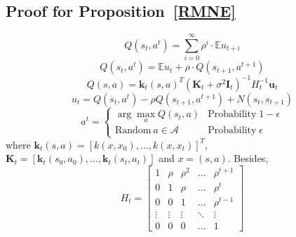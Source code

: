 \documentclass{article}
\begin{document}
%

\subsection{Proof for Proposition~\ref{RMNE}}
\begin{equation}
\label{Qfun}
Q(s_t, a^t)= {\sum}_{i=0}^{\infty} \rho^{i} \cdot \mathbb{E}u_{t+i}
\end{equation}
\begin{equation}
Q(s_t, a^t)= \mathbb{E}u_{t}+\rho\cdot Q(s_{t+1}, a^{t+1})
\end{equation}
\begin{equation}
Q(s,a) = \bm{k}_t(s,a)^{T} (\bm{K}_t+\sigma^2 \bm{I}_t)^{-1} H_t^{-1} \bm{u}_t
\end{equation}
\begin{equation}
u_{t} = Q(s_t,a^t)-\rho Q(s_{t+1}, a^{t+1}) + N(s_t, s_{t+1})
\end{equation}
\begin{equation}
a^{t} = 
\left\{
\begin{array}{lc}
\arg\max_a Q(s_t,a) & \mathrm{Probability }\;1-\epsilon\\
\mathrm{Random\ } a\in\mathcal{A} & \mathrm{Probability }\;\epsilon
\end{array}
\right.
\end{equation}
where $\bm{k}_t(s,a) = [k(x, x_0), \ldots, k(x, x_t)]^{T}$, $\bm{K}_t=[\bm{k}_t(s_0,a_0),\ldots,\bm{k}_t(s_t,a_t)]$ and $x=(s,a)$. Besides,
\begin{equation}
H_t = \left[
\begin{array}{ccccc}
1 & \rho & \rho^2 &\ldots & \rho^{t+1}\\
0 & 1 & \rho & \ldots & \rho^{t}\\
0 & 0 & 1 & \ldots & \rho^{t-1} \\
\vdots & \vdots & \vdots & \ddots& \vdots\\
0 & 0 & 0 & \ldots & 1
\end{array}
\right]
\end{equation}
\\
\end{document}
